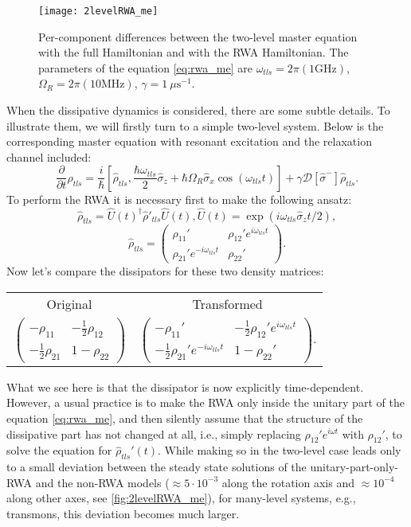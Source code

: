 \begin{figure}
\centering
\texttt{[image: 2levelRWA\_me]}
\caption{Per-component differences between the two-level master equation with the full Hamiltonian and with the RWA Hamiltonian. The parameters of the equation \eqref{eq:rwa_me}  are $\omega_{tls} = 2\pi (1 \text{GHz})$, $\Omega_R = 2\pi (10 \text{MHz})$, $\gamma =1\ \mu\text{s}^{-1}$.}
\label{fig:2levelRWA_me}
\end{figure}

When the dissipative dynamics is considered, there are some subtle details. To illustrate them, we will firstly turn to a simple two-level system. Below is the corresponding master equation with resonant excitation and the relaxation channel included:
\begin{equation}
\frac{\partial}{\partial t} \hat{\rho}_{tls} = \frac{i}{\hbar}[\hat{\rho}_{tls}, \frac{\hbar \omega_{tls}}{2} \hat{\sigma}_z+\hbar \Omega_R\hat{\sigma}_x \cos( \omega_{tls} t)] + \gamma \mathcal{D}[\hat \sigma^-]\hat\rho_{tls}.
\label{eq:rwa_me}
\end{equation}
To perform the RWA it is necessary first to make the following ansatz:
\[
\hat{\rho}_{tls} = \hat U(t)^\dag \hat{\rho}'_{tls} \hat U(t),\hat U(t) = \exp(i\omega_{tls}\hat\sigma_z t/2),
\]
\[
\hat{\rho}_{tls} = \left(\begin{matrix}
\rho_{11}' & \rho_{12}' e^{i\omega_{tls} t} \\
\rho_{21}' e^{-i\omega_{tls} t} & \rho_{22}'
\end{matrix}\right).
\]
Now let's compare the dissipators for these two density matrices:

\begin{center}
\begin{tabular}{c | c}
Original & Transformed\\
$
\left(\begin{matrix}
-\rho_{11} & -\frac{1}{2} \rho_{12}  \\
-\frac{1}{2} \rho_{21} & 1-\rho_{22}
\end{matrix}\right)
$ & $
\left(\begin{matrix}
-\rho_{11}' & -\frac{1}{2} \rho_{12}'  e^{i\omega_{tls} t}\\
-\frac{1}{2} \rho_{21}' e^{-i\omega_{tls} t} & 1-\rho_{22}'
\end{matrix}\right).
$ 
\end{tabular}
\end{center}
What we see here is that the dissipator is now explicitly time-dependent. However, a usual practice is to make the RWA only inside the unitary part of the equation \eqref{eq:rwa_me}, and then silently assume that the structure of the dissipative part has not changed at all, i.e., simply replacing $ \rho_{12}'  e^{i\omega t}$ with $ \rho_{12}'$, to solve the equation for $\hat{\rho}_{tls}'(t)$. While making so in the two-level case leads only to a small deviation between the steady state solutions of the unitary-part-only-RWA and the non-RWA models ($\approx 5\cdot 10^{-3}$ along the rotation axis and $\approx 10^{-4}$ along other axes, see \autoref{fig:2levelRWA_me}), for many-level systems, e.g., transmons, this deviation becomes much larger.


